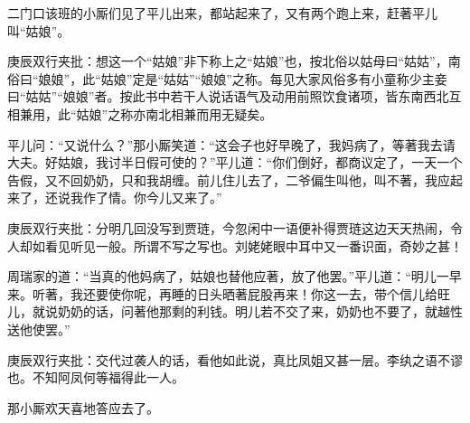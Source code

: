 \begin{parag}
    二门口该班的小厮们见了平儿出来，都站起来了，又有两个跑上来，赶著平儿叫“姑娘”。\begin{note}庚辰双行夹批：想这一个“姑娘”非下称上之“姑娘”也，按北俗以姑母曰“姑姑”，南俗曰“娘娘”，此“姑娘”定是“姑姑”“娘娘”之称。每见大家风俗多有小童称少主妾曰“姑姑”“娘娘”者。按此书中若干人说话语气及动用前照饮食诸项，皆东南西北互相兼用，此“姑娘”之称亦南北相兼而用无疑矣。\end{note}平儿问：“又说什么？”那小厮笑道：“这会子也好早晚了，我妈病了，等著我去请大夫。好姑娘，我讨半日假可使的？”平儿道：“你们倒好，都商议定了，一天一个告假，又不回奶奶，只和我胡缠。前儿住儿去了，二爷偏生叫他，叫不著，我应起来了，还说我作了情。你今儿又来了。”\begin{note}庚辰双行夹批：分明几回没写到贾琏，今忽闲中一语便补得贾琏这边天天热闹，令人却如看见听见一般。所谓不写之写也。刘姥姥眼中耳中又一番识面，奇妙之甚！\end{note}周瑞家的道：“当真的他妈病了，姑娘也替他应著，放了他罢。”平儿道：“明儿一早来。听著，我还要使你呢，再睡的日头晒著屁股再来！你这一去，带个信儿给旺儿，就说奶奶的话，问著他那剩的利钱。明儿若不交了来，奶奶也不要了，就越性送他使罢。”\begin{note}庚辰双行夹批：交代过袭人的话，看他如此说，真比凤姐又甚一层。李纨之语不谬也。不知阿凤何等福得此一人。\end{note}那小厮欢天喜地答应去了。
\end{parag}



